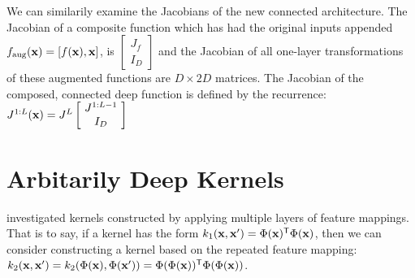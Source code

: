 \documentclass{article}
\begin{document}
We can similarily examine the Jacobians of the new connected architecture.  The Jacobian of a composite function which has had the original inputs appended 
$f_\textnormal{aug}({\bf{x}}) = [ f({\bf{x}}), {\bf{x}} ]$,
is 
$ \left[ \! \begin{array}{c} J_f \\ I_D  \end{array} \! \right] $
 and the Jacobian of all one-layer transformations of these augmented functions are $D \times 2D$ matrices.
The Jacobian of the composed, connected deep function is defined by the recurrence:
%
\newcommand{\sbi}[2]{\left[ \! \begin{array}{c} #1 \\ #2 \end{array} \! \right]} 
$J^{1:L}(\vx) = J^L \sbi{ J^{1:L-1}}{I_D}$
%
%





\section{Arbitarily Deep Kernels}
\label{sec:deep_kernels}

\cite{cho2012kernel} investigated kernels constructed by applying multiple layers of feature mappings.  That is to say, if a kernel has the form $k_1({\bf{x}}, {\bf{x}}') = \Phi({\bf{x}}) {^\mathsf{T}} \Phi({\bf{x}})$, then we can consider constructing a kernel based on the repeated feature mapping: $k_2({\bf{x}}, {\bf{x}}') = k_2(\Phi({\bf{x}}), \Phi({\bf{x}}')) = \Phi(\Phi({\bf{x}})) {^\mathsf{T}} \Phi(\Phi({\bf{x}}))$.
%
\end{document}
